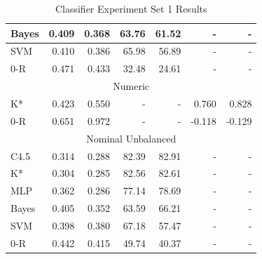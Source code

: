 \documentclass[../thesis/thesis.tex]{subfiles}
\begin{document}
\begin{table}
\begin{tabular}{|l|r|r|r|r|r|r|}
Bayes               & 0.409                                 & 0.368        & 63.76       & 61.52         & -           & -                                     \\ \hline
SVM                 & 0.410                                 & 0.386        & 65.98       & 56.89         & -           & -                                     \\ \hline
0-R                 & 0.471                                 & 0.433        & 32.48       & 24.61         & -           & -                                     \\ \hline
\multicolumn{7}{|c|}{Numeric}                                                                                                                                  \\ \hline
K*                  & 0.423                                 & 0.550        & -           & -             & 0.760       & 0.828                                 \\ \hline
0-R                 & 0.651                                 & 0.972        & -           & -             & -0.118      & -0.129                                \\ \hline
\multicolumn{7}{|c|}{Nominal Unbalanced}                                                                                                                       \\ \hline
C4.5                & 0.314                                 & 0.288        & 82.39       & 82.91         & -           & -                                     \\ \hline
K*                  & 0.304                                 & 0.285        & 82.56       & 82.61         & -           & -                                     \\ \hline
MLP                 & 0.362                                 & 0.286        & 77.14       & 78.69         & -           & -                                     \\ \hline
Bayes               & 0.405                                 & 0.352        & 63.59       & 66.21         & -           & -                                     \\ \hline
SVM                 & 0.398                                 & 0.380        & 67.18       & 57.47         & -           & -                                     \\ \hline
0-R                 & 0.442                                 & 0.415        & 49.74       & 40.37         & -           & -                                     \\ \hline
\end{tabular}
\caption{Classifier Experiment Set 1 Results}
\label{tab:results:set1}
\end{table}
\end{document}
